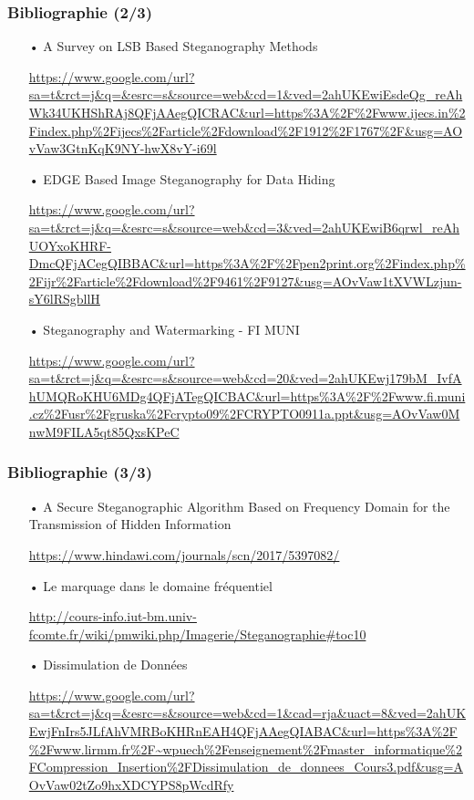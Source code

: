 \documentclass{beamer}
\begin{document}
\begin{frame}
\frametitle{Bibliographie (2/3)}
	
\begin{itemize}
\item[•] A Survey on LSB Based Steganography Methods
\item[] \url{https://www.google.com/url?sa=t&rct=j&q=&esrc=s&source=web&cd=1&ved=2ahUKEwiEsdeQg_reAhWk34UKHShRAj8QFjAAegQICRAC&url=https\%3A\%2F\%2Fwww.ijecs.in\%2Findex.php\%2Fijecs\%2Farticle\%2Fdownload\%2F1912\%2F1767\%2F&usg=AOvVaw3GtnKqK9NY-hwX8vY-i69l}
\item[•] EDGE Based Image Steganography for Data Hiding
\item[]  \url{https://www.google.com/url?sa=t&rct=j&q=&esrc=s&source=web&cd=3&ved=2ahUKEwiB6qrwl_reAhUOYxoKHRF-DmcQFjACegQIBBAC&url=https\%3A\%2F\%2Fpen2print.org\%2Findex.php\%2Fijr\%2Farticle\%2Fdownload\%2F9461\%2F9127&usg=AOvVaw1tXVWLzjun-sY6lRSgbllH}
\item[•] Steganography and Watermarking - FI MUNI
\item[] \url{https://www.google.com/url?sa=t&rct=j&q=&esrc=s&source=web&cd=20&ved=2ahUKEwj179bM_IvfAhUMQRoKHU6MDg4QFjATegQICBAC&url=https\%3A\%2F\%2Fwww.fi.muni.cz\%2Fusr\%2Fgruska\%2Fcrypto09\%2FCRYPTO0911a.ppt&usg=AOvVaw0MnwM9FILA5qt85QxsKPeC}
\end{itemize}
\end{frame}

\begin{frame}
\frametitle{Bibliographie (3/3)}
	
\begin{itemize}
\item[•] A Secure Steganographic Algorithm Based on Frequency Domain for the Transmission of Hidden Information
\item[] \url{https://www.hindawi.com/journals/scn/2017/5397082/}
\item[•]  Le marquage dans le domaine fréquentiel
\item[] \url{http://cours-info.iut-bm.univ-fcomte.fr/wiki/pmwiki.php/Imagerie/Steganographie\#toc10}
\item[•]  Dissimulation de Données
\item[] \url{https://www.google.com/url?sa=t&rct=j&q=&esrc=s&source=web&cd=1&cad=rja&uact=8&ved=2ahUKEwjFnIrs5JLfAhVMRBoKHRnEAH4QFjAAegQIABAC&url=https\%3A\%2F\%2Fwww.lirmm.fr\%2F~wpuech\%2Fenseignement\%2Fmaster_informatique\%2FCompression_Insertion\%2FDissimulation_de_donnees_Cours3.pdf&usg=AOvVaw02tZo9hxXDCYPS8pWcdRfy}
\end{itemize}
\end{frame}
\end{document}
